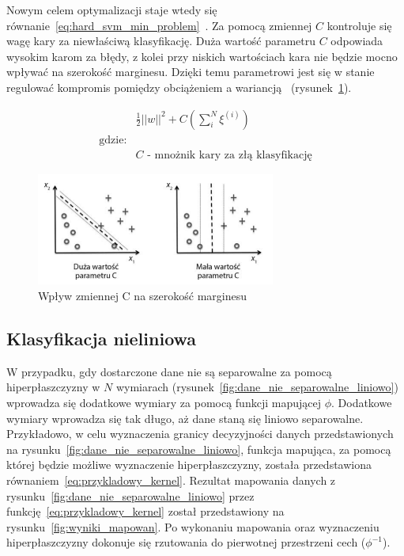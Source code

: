 \pagebreak

\noindent Nowym celem optymalizacji staje wtedy się równanie~\ref{eq:hard_svm_min_problem}~\cite{raschka2017python}.
Za pomocą zmiennej $C$ kontroluje się wagę kary za niewłaściwą klasyfikację.
Duża wartość parametru $C$ odpowiada wysokim karom za błędy, z kolei przy niskich wartościach
kara nie będzie mocno wpływać na szerokość marginesu.
Dzięki temu parametrowi jest się w stanie regulować kompromis pomiędzy
obciążeniem a wariancją~\cite{raschka2017python} (rysunek~\ref{fig:wplyw_c_na_svm}).

\begin{equation}
    \begin{aligned}
        &\frac{1}{2}||w||^2 + C (\sum_{i}^{N} \xi^{(i)})\\
        \text{gdzie:} \\
        &C \text{ - mnożnik kary za złą klasyfikację}
    \end{aligned}
    \label{eq:hard_svm_min_problem}
\end{equation}

\bigskip
\bigskip
\bigskip

\begin{figure}[H]
    \centering
    \includegraphics[width=0.7\textwidth]{images/wplyw_c_na_svm}
    \caption{  Wpływ zmiennej C na szerokość marginesu }
    \label{fig:wplyw_c_na_svm}
\end{figure}

\pagebreak

\subsection{Klasyfikacja nieliniowa}

W przypadku, gdy dostarczone dane nie są separowalne za pomocą hiperpłaszczyzny
w $N$ wymiarach (rysunek~\ref{fig:dane_nie_separowalne_liniowo})
wprowadza się dodatkowe wymiary za pomocą funkcji mapującej $\phi$.
Dodatkowe wymiary wprowadza się tak długo, aż dane staną się liniowo separowalne.
Przykładowo, w celu wyznaczenia granicy decyzyjności danych
przedstawionych na rysunku~\ref{fig:dane_nie_separowalne_liniowo},
funkcja mapująca, za pomocą której będzie możliwe wyznaczenie hiperpłaszczyzny,
została przedstawiona równaniem~\ref{eq:przykladowy_kernel}.
Rezultat mapowania danych z rysunku~\ref{fig:dane_nie_separowalne_liniowo} przez funkcję~\ref{eq:przykladowy_kernel}
został przedstawiony na rysunku~\ref{fig:wyniki_mapowan}.
Po wykonaniu mapowania oraz wyznaczeniu hiperpłaszczyzny dokonuje się rzutowania do pierwotnej przestrzeni cech ($\phi^{-1}$).

